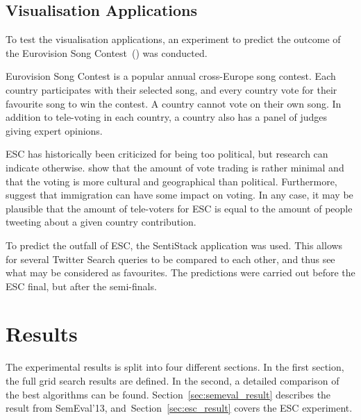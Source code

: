 \section{Visualisation Applications}

To test the visualisation applications, an experiment to predict the outcome of the Eurovision Song Contest~() was conducted.

Eurovision Song Contest is a popular annual cross-Europe song contest. Each country participates with their selected song, and every country vote for their favourite song to win the contest. A country cannot vote on their own song. In addition to tele-voting in each country, a country also has a panel of judges giving expert opinions.

ESC has historically been criticized for being too political, but research can indicate otherwise. \cite{ginsburgh2008eurovision} show that the amount of vote trading is rather minimal and that the voting is more cultural and geographical than political. Furthermore, \cite{ginsburgh2008eurovision} suggest that immigration can have some impact on voting. In any case, it may be plausible that the amount of tele-voters for ESC is equal to the amount of people tweeting about a given country contribution.

To predict the outfall of ESC, the SentiStack application was used. This allows for several Twitter Search queries to be compared to each other, and thus see what may be considered as favourites. The predictions were carried out before the ESC final, but after the semi-finals.  

%


\chapter{Results}
\label{sec:results}


The experimental results is split into four different sections. In the first section, the full grid search results are defined. In the second, a detailed comparison of the best algorithms can be found. Section~\ref{sec:semeval_result} describes the result from SemEval'13, and~Section~\ref{sec:esc_result} covers the ESC experiment.

